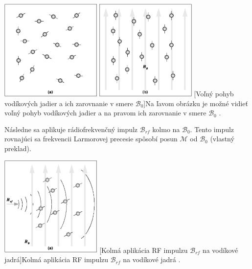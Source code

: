 \begin {center}
        \centering
        \includegraphics[height=5cm]{media/hydrogen/hydrogen_moving_freely.png}
        \includegraphics[height=5cm]{media/hydrogen/hydrogen_oscilating.png}
        \captionsetup{justification=centering}
        [Voľný pohyb vodíkových jadier a ich zarovnanie v smere $\mathcal{B}_{0}$]{Na ľavom obrázku je možné vidieť voľný pohyb vodíkových jadier a na pravom ich zarovnanie v smere $\mathcal{B}_{0}$ \cite{basic_principles_of_mri}.}
\end {center}

Následne sa aplikuje rádiofrekvenčný impulz $\mathcal{B}_{rf}$ kolmo na $\mathcal{B}_{0}$.
Tento impulz rovnajúci sa frekvencii Larmorovej precesie spôsobí posun $\mathcal{M}$ od $\mathcal{B}_{0}$ \cite{basic_principles_of_mri} (vlastný preklad).

\begin {center}
        \centering
        \includegraphics[height=5cm]{media/hydrogen/hydrogen_reacting_to_rf.png}
        \captionsetup{justification=centering}
        [Kolmá aplikácia RF impulzu $\mathcal{B}_{rf}$ na vodíkové jadrá]{Kolmá aplikácia RF impulzu $\mathcal{B}_{rf}$ na vodíkové jadrá \cite{basic_principles_of_mri}.}
\end {center}

